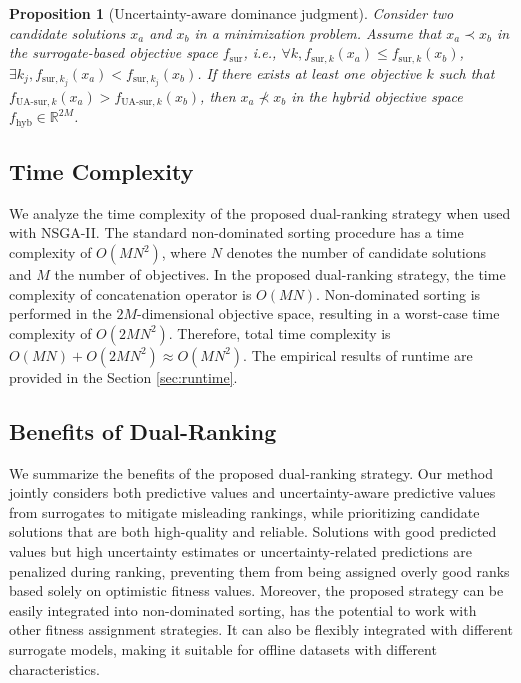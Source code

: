 \documentclass{article}
\newtheorem{proposition}{Proposition}
\begin{document}
\begin{proposition}[Uncertainty-aware dominance judgment] \label{proposition_2}
Consider two candidate solutions $x_a$ and $x_b$ in a minimization problem.
Assume that $x_a \prec x_b$ in the surrogate-based objective space
$f_{\text{sur}}$, \emph{i.e.},
$\forall k, f_{\text{sur},k}(x_a) \le f_{\text{sur},k}(x_b)$, 
$\exists k_j, f_{\text{sur},k_j}(x_a) < f_{\text{sur},k_j}(x_b)$.
If there exists at least one objective $k$ such that
$f_{\text{UA-sur},k}(x_a) > f_{\text{UA-sur},k}(x_b)$, then $x_a \not\prec x_b$ in the hybrid objective space $f_{\text{hyb}} \in \mathbb{R}^{2M}$.
\end{proposition}

\subsection{Time Complexity}
We analyze the time complexity of the proposed dual-ranking strategy when used with NSGA-II. The standard non-dominated sorting procedure has a time complexity of $O(MN^2)$, where $N$ denotes the number of candidate solutions and $M$ the number of objectives. In the proposed dual-ranking strategy, the time complexity of concatenation operator is $O(MN)$. Non-dominated sorting is performed in the $2M$-dimensional objective space, resulting in a worst-case time complexity of $O(2MN^2)$. Therefore, total time complexity is $O(MN) + O(2MN^2) \approx O(MN^2)$. The empirical results of runtime are provided in the Section \ref{sec:runtime}.

\subsection{Benefits of Dual-Ranking}
We summarize the benefits of the proposed dual-ranking strategy. Our method jointly considers both predictive values and uncertainty-aware predictive values from surrogates to mitigate misleading rankings, while prioritizing candidate solutions that are both high-quality and reliable. Solutions with good predicted values but high uncertainty estimates or uncertainty-related predictions are penalized during ranking, preventing them from being assigned overly good ranks based solely on optimistic fitness values. Moreover, the proposed strategy can be easily integrated into non-dominated sorting, has the potential to work with other fitness assignment strategies. It can also be flexibly integrated with different surrogate models, making it suitable for offline datasets with different characteristics.
\end{document}
